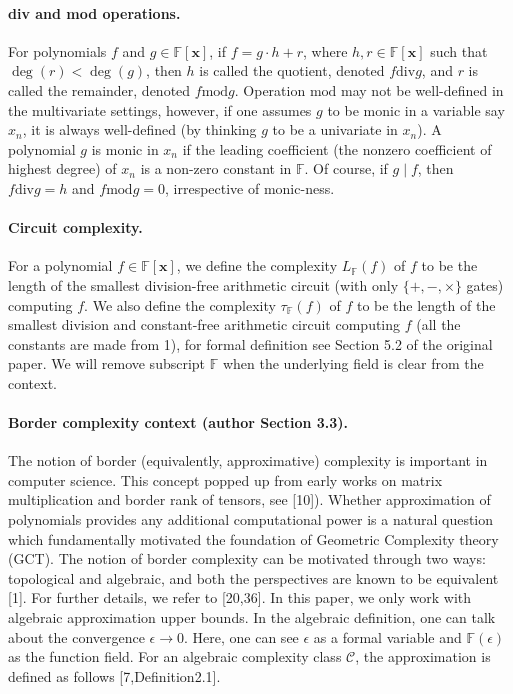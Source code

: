 \documentclass[10pt,a4paper]{article}
\begin{document}
\paragraph{div and mod operations.} For polynomials $f$ and $g\in\mathbb F[\mathbf x]$, if $f=g\cdot h+r$, where $h,r\in\mathbb F[\mathbf x]$ such that $\deg(r)<\deg(g)$, then $h$ is called the quotient, denoted $f\mathbin{\mathrm{div}}g$, and $r$ is called the remainder, denoted $f\mathbin{\mathrm{mod}}g$. Operation $\mathrm{mod}$ may not be well-defined in the multivariate settings, however, if one assumes $g$ to be monic in a variable say $x_n$, it is always well-defined (by thinking $g$ to be a univariate in $x_n$). A polynomial $g$ is monic in $x_n$ if the leading coefficient (the nonzero coefficient of highest degree) of $x_n$ is a non-zero constant in $\mathbb F$. Of course, if $g\mid f$, then $f\mathbin{\mathrm{div}}g=h$ and $f\mathbin{\mathrm{mod}}g=0$, irrespective of monic-ness.
\paragraph{Circuit complexity.} For a polynomial $f\in\mathbb F[\mathbf x]$, we define the complexity $L_{\mathbb F}(f)$ of $f$ to be the length of the smallest division-free arithmetic circuit (with only $\{+,-,\times\}$ gates) computing $f$. We also define the complexity $\tau_{\mathbb F}(f)$ of $f$ to be the length of the smallest division and constant-free arithmetic circuit computing $f$ (all the constants are made from 1), for formal definition see Section 5.2 of the original paper. We will remove subscript $\mathbb F$ when the underlying field is clear from the context.
\paragraph{Border complexity context (author Section 3.3).} The notion of border (equivalently, approximative) complexity is important in computer science. This concept popped up from early works on matrix multiplication and border rank of tensors, see [10]). Whether approximation of polynomials provides any additional computational power is a natural question which fundamentally motivated the foundation of Geometric Complexity theory (GCT). The notion of border complexity can be motivated through two ways: topological and algebraic, and both the perspectives are known to be equivalent [1]. For further details, we refer to [20,36]. In this paper, we only work with algebraic approximation upper bounds. In the algebraic definition, one can talk about the convergence $\epsilon\to0$. Here, one can see $\epsilon$ as a formal variable and $\mathbb F(\epsilon)$ as the function field. For an algebraic complexity class $\mathcal C$, the approximation is defined as follows [7,Definition2.1].
\end{document}
